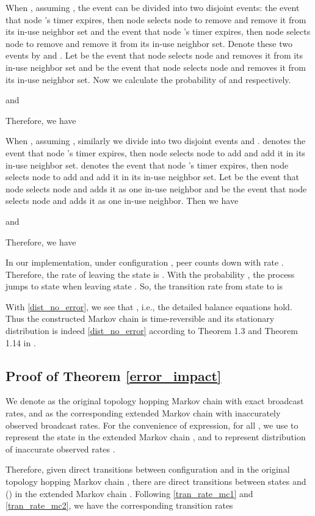 \documentclass[10pt,conference]{IEEEtran}
\begin{document}
When ,
assuming ,
the event  can be divided into two disjoint events: the
event that node 's timer expires, then node  selects node
 to remove and remove it from its in-use neighbor set and the
event that node 's timer expires, then node  selects node
 to remove and remove it from its in-use neighbor set. Denote
these two events by  and 
. Let  be the event that node  selects node  and removes
it from its in-use neighbor set and  be the event that node
 selects node  and removes it from its in-use neighbor set.
Now we calculate the probability of 
and  respectively.


and

Therefore, we have


When ,
assuming ,
similarly we divide  into two disjoint events 
and . 
denotes the event that node 's timer expires, then node  selects
node  to add and add it in its in-use neighbor set. 
denotes the event that node 's timer expires, then node  selects
node  to add and add it in its in-use neighbor set. Let 
be the event that node  selects node  and adds it as one in-use
neighbor and  be the event that node  selects node 
and adds it as one in-use neighbor. Then we have


and

Therefore, we have


In our implementation, under configuration , peer  counts down
with rate .
Therefore, the rate of leaving the state  is
.
With the probability , the process jumps to state 
when leaving state . So, the transition rate from state  to
 is


With \eqref{dist_no_error}, we see that
, i.e., the detailed balance equations hold. Thus the
constructed Markov chain is time-reversible and its stationary
distribution is indeed \eqref{dist_no_error} according to Theorem
1.3 and Theorem 1.14 in \cite{Kelly79}.

\subsection{Proof of Theorem
\ref{error_impact}}\label{sec:error_impact}

We denote  as the original topology hopping Markov chain with
exact broadcast rates, and  as the corresponding extended Markov
chain with inaccurately observed broadcast rates. For the
convenience of expression, for all , we use  to represent the state
 in the extended Markov chain ,
and  to represent distribution of inaccurate observed
rates .

Therefore, given direct transitions between configuration  and
 in the original topology hopping Markov chain , there are
direct transitions between states  and  () in the
extended Markov chain . Following \eqref{tran_rate_mc1} and
\eqref{tran_rate_mc2}, we have the corresponding transition rates
\end{document}
